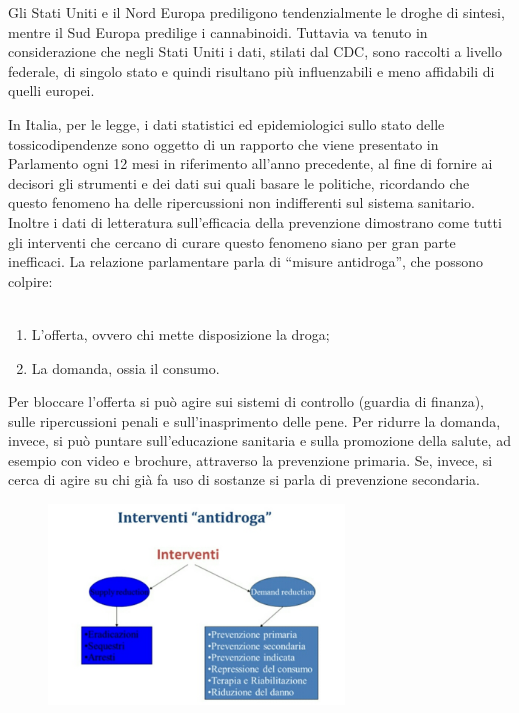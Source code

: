 Gli Stati Uniti e il Nord Europa prediligono tendenzialmente le droghe
di sintesi, mentre il Sud Europa predilige i cannabinoidi. Tuttavia va
tenuto in considerazione che negli Stati Uniti i dati, stilati dal CDC,
sono raccolti a livello federale, di singolo stato e quindi risultano
più influenzabili e meno affidabili di quelli europei.

In Italia, per le legge, i dati statistici ed epidemiologici sullo stato
delle tossicodipendenze sono oggetto di un rapporto che viene presentato
in Parlamento ogni 12 mesi in riferimento all'anno precedente, al fine
di fornire ai decisori gli strumenti e dei dati sui quali basare le
politiche, ricordando che questo fenomeno ha delle ripercussioni non
indifferenti sul sistema sanitario. Inoltre i dati di letteratura
sull'efficacia della prevenzione dimostrano come tutti gli interventi
che cercano di curare questo fenomeno siano per gran parte inefficaci.
La relazione parlamentare parla di ``misure antidroga'', che possono
colpire:
\\\\
\begin{enumerate}
\def\labelenumi{\arabic{enumi}.}
\item
  L'offerta, ovvero chi mette disposizione la droga;
\item
  La domanda, ossia il consumo.
\end{enumerate}

Per bloccare l'offerta si può agire sui sistemi di controllo (guardia di
finanza), sulle ripercussioni penali e sull'inasprimento delle pene. Per
ridurre la domanda, invece, si può puntare sull'educazione sanitaria e
sulla promozione della salute, ad esempio con video e brochure,
attraverso la prevenzione primaria. Se, invece, si cerca di agire su chi
già fa uso di sostanze si parla di prevenzione secondaria.

\begin{figure}[!ht]
\centering
	\includegraphics[width=0.7\textwidth]{18/image7.jpeg}
\end{figure}


